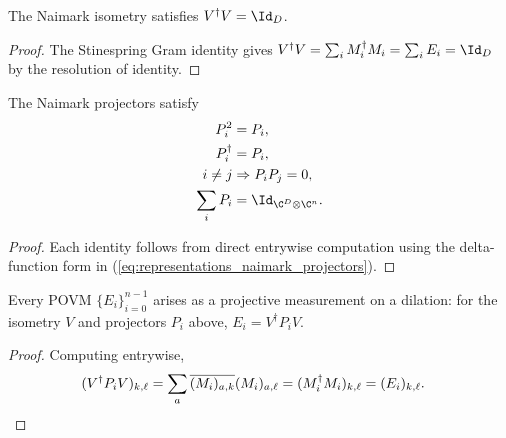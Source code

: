 \begin{theorem}\label{thm:naimark_isometry_isometry}
    \leanok
    The Naimark isometry satisfies $V^\dagger V=\Id_D$.
\end{theorem}

\begin{proof}
    \leanok
    The Stinespring Gram identity gives
    $V^\dagger V=\sum_iM_i^\dagger M_i=\sum_iE_i=\Id_D$
    by the resolution of identity.
\end{proof}

\begin{theorem}
    \label{thm:naimark_projection_axioms}
    \leanok
    The Naimark projectors satisfy
    \begin{align}
        P_i^2
        &=P_i,
        \notag\\
        P_i^\dagger
        &=P_i,
        \notag\\
        i\ne j
        &\Rightarrow P_iP_j=0,
        \notag\\
        \sum_iP_i
        &=\Id_{\C^D\otimes\C^n}.
        \notag
    \end{align}
\end{theorem}

\begin{proof}
    \leanok
    Each identity follows from direct entrywise computation using the
    delta-function form in (\ref{eq:representations_naimark_projectors}).
\end{proof}

\begin{theorem}\label{thm:naimark_recovers_povm}
    \leanok
    Every POVM $\{E_i\}_{i=0}^{n-1}$ arises as a projective measurement on a
    dilation: for the isometry $V$ and projectors $P_i$ above,
    $E_i=V^\dagger P_iV$.
\end{theorem}

\begin{proof}
    \leanok
    Computing entrywise,
    \begin{align}
        (V^\dagger P_iV)_{k,\ell}
        &=\sum_a\overline{(M_i)_{a,k}}(M_i)_{a,\ell}
          =(M_i^\dagger M_i)_{k,\ell}
          =(E_i)_{k,\ell}.
        \notag
    \end{align}
\end{proof}

